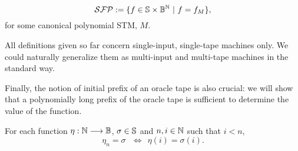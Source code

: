 \begin{defn}\label{df:SFP}
$$
\mathcal{SFP} := \{ f \in \mathbb{S} \times \mathbb{B}^{\mathbb{N}} \ | \
f = f_{M}\},
$$
for some canonical polynomial STM, $M$.
\end{defn}
%
%
\noindent



\begin{remark}
All definitions given so far concern single-input,
single-tape machines only.
%
We could naturally generalize them as
multi-input and multi-tape machines
in the standard way.
\end{remark}





Finally, the notion of initial prefix of an
oracle tape is also crucial:
we will show that a polynomially long prefix
of the oracle tape is sufficient to determine
the value of the function.


\begin{defn}
For each function $\eta : \mathbb{N} \longrightarrow \mathbb{B}$,
$\sigma \in \mathbb{S}$ and  $n,i\in \mathbb{N}$ such that
$i<n$,
$$
\eta_n = \sigma \ \ \ \Leftrightarrow \ \ \eta(i)=
{\sigma(i)}.
$$
\end{defn}
%
%
\noindent







